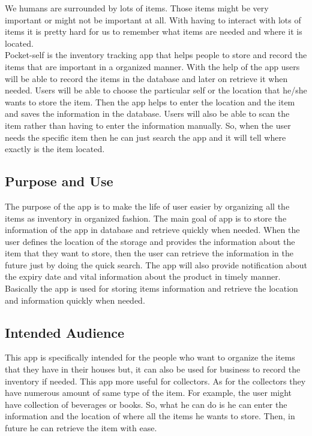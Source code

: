 We humans are surrounded by lots of items. Those items might be very important or might not be important at all. With having to interact with lots of items it is pretty hard for us to remember what items are needed and where it is located.\\
Pocket-self is the inventory tracking app that helps people to store and record the items that are important in a organized manner. With the help of the app users will be able to record the items in the database and later on retrieve it when needed. Users will be able to choose the particular self or the location that he/she wants to store the item. Then the app helps to enter the location and the item and saves the information in the database. Users will also be able to scan the item rather than having to enter the information manually. So, when the user needs the specific item then he can just search the app and it will tell where exactly is the item located.


\subsection{Purpose and Use}
The purpose of the app is to make the life of user easier by organizing all the items as inventory in organized fashion. The main goal of app is to store the information of the app in database and retrieve quickly when needed. When the user defines the location of the storage and provides the information about the item that they want to store, then the user can retrieve the information in the future just by doing the quick search. The app will also provide notification about the expiry date and vital information about the product in timely manner. Basically the app is used for storing items information and retrieve the location and information quickly when needed.

\subsection{Intended Audience}
This app is specifically intended for the people who want to organize the items that they have in their houses but, it can also be used for business to record the inventory if needed. This app more useful for collectors. As for the collectors they have numerous amount of same type of the item. For example, the user might have collection of beverages or books. So, what he can do is he can enter the information and the location of where all the items he wants to store. Then, in future he can retrieve the item with ease.


